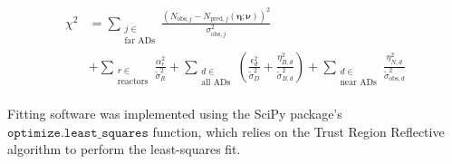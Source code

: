 \begin{align}
    \begin{split}
        \chi^2 &= \sum_{\substack{j \in \\\text{far ADs}}}
            \frac{
                (N_{\text{obs},j}
                - N_{\text{pred},j}(\boldsymbol{\eta};\boldsymbol{\nu}))^2}
            {\sigma_{\text{obs},j}^2 } \\
            &+ \sum_{\substack{r \in \\\text{reactors}}}
                \frac{\alpha_r^2}{\tilde{\sigma}_R^2}
            + \sum_{\substack{d \in \\\text{all ADs}}}
            \left(
                \frac{\epsilon_d^2}{\tilde{\sigma}_D^2}
                + \frac{\eta_{B,d}^2}{\tilde{\sigma}_{B,d}^2}
            \right)
            + \sum_{\substack{d \in \\\text{near ADs}}}
            \frac{\eta_{N,d}^2}{\tilde{\sigma}^2_{\text{obs},d}}
    \end{split}
\end{align}

Fitting software was implemented using the SciPy package's
$\mathtt{optimize.least\_squares}$ function,
which relies on the Trust Region Reflective algorithm 
to perform the least-squares fit.







